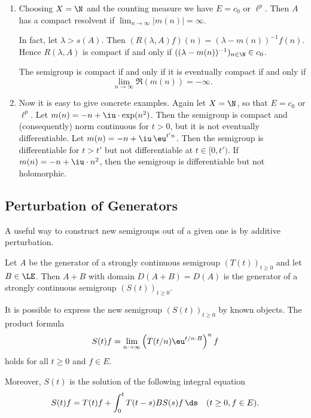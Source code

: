 \begin{example}
\begin{enumerate}[\upshape (i), wide, labelindent=.25em]
\item \label{ex:a2-1.28-4}
Choosing $X = \N$ and the counting measure we have $E = c_{0}$ or $\ell^{p}$.
Then $A$ has a compact resolvent if 
$\lim_{n \to \infty} |m(n)| = \infty$.  

In fact, let $\lambda > s(A)$.
Then $(R(\lambda,A)f)(n) = (\lambda-m(n))^{-1}f(n)$.
Hence $R(\lambda,A)$ is compact if and only if\/ $((\lambda-m(n))^{-1})_{n \in \N} \in c_{0}$. 

The semigroup is compact if and only if it is eventually compact if and only if 
\[
\lim_{n \to \infty} \Re(m(n)) = -\infty.
\]

\item \label{ex:a2-1.28-5}
Now it is easy to give concrete examples.
Again let $X = \N$, so that $E = c_{0}$ or $\ell^{p}$.
Let $m(n) = -n + \iu \cdot \exp(n^{2})$.
Then the semigroup is compact and (consequently) norm continuous for $t > 0$, but it is not eventually differentiable.
Let $m(n) = -n + \iu \,\eu^{t'n}$.
Then the semigroup is differentiable for $t > t'$ but not differentiable at $t \in [0,t')$.
If\/ $m(n) = -n +\iu \cdot n^2$, then the semigroup is differentiable but not holomorphic.
\end{enumerate}
\end{example}	

\subsection{Perturbation of Generators} \label{subsec:a2-1.se8}
A useful way to construct new semigroups out of a given one is by additive perturbation.%
\begin{theorem}\label{thm:a2-1.29}
Let $A$ be the generator of a strongly continuous semigroup $(T(t))_{t \geq 0}$ and let $B \in \LE$.
Then $A + B$ with domain $D(A+B) = D(A)$ is the generator of a strongly continuous semigroup $(S(t))_{t \geq 0}$.
\end{theorem}

It is possible to express the new semigroup $(S(t))_{t \geq 0}$ by known objects.
The product formula
\begin{equation}\label{eq:a2-1.8}
    S(t)f = \lim_{n \to \infty} \left( T(t/n)\eu^{t/n \cdot B} \right)^{n} f
\end{equation}
holds for all $t \geq 0$ and $f \in E$.

Moreover, $S(t)$ is the solution of the following integral equation
\begin{equation}\label{eq:a2-1.9}
    S(t)f = T(t)f + \int_{0}^{t} T(t-s)BS(s)f\, \ds \quad (t \geq 0, f \in E).
\end{equation}

